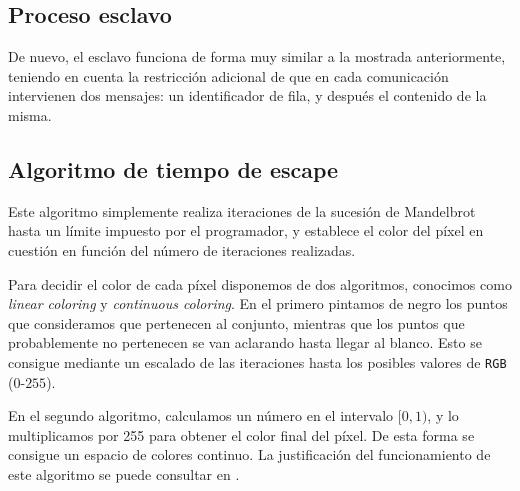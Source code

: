 \documentclass[11pt]{article}
\begin{document}


\subsection*{Proceso esclavo}
De nuevo, el esclavo funciona de forma muy similar a la mostrada anteriormente, teniendo en cuenta la restricción adicional de que en cada comunicación intervienen dos mensajes: un identificador de fila, y después el contenido de la misma.
\vspace{0.5em}



\subsection*{Algoritmo de tiempo de escape}
Este algoritmo simplemente realiza iteraciones de la sucesión de Mandelbrot hasta un límite impuesto por el programador, y establece el color del píxel en cuestión en función del número de iteraciones realizadas. 
\vspace{0.5em}



\vspace{0.5em}
Para decidir el color de cada píxel disponemos de dos algoritmos, conocimos como \textit{linear coloring} y \textit{continuous coloring}. En el primero pintamos de negro los puntos que consideramos que pertenecen al conjunto, mientras que los puntos que probablemente no pertenecen se van aclarando hasta llegar al blanco. Esto se consigue mediante un escalado de las iteraciones hasta los posibles valores de \verb|RGB| ($0$-$255$).
\vspace{0.5em}



\vspace{0.5em}
En el segundo algoritmo, calculamos un número en el intervalo $[0,1)$, y lo multiplicamos por 255 para obtener el color final del píxel. De esta forma se consigue un espacio de colores continuo. La justificación del funcionamiento de  este algoritmo se puede consultar en \cite{mandelbrot_smooth}.
\vspace{0.5em}


\end{document}
